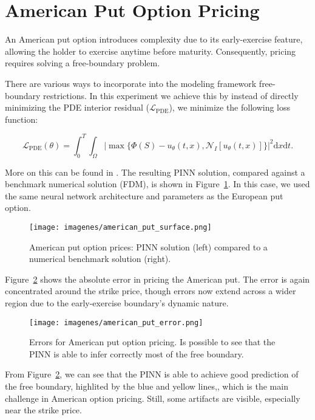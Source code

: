 \documentclass[12pt]{report} %
\theoremstyle{plain} %
\theoremstyle{definition} %
\theoremstyle{remark} %
\begin{document}
\section{American Put Option Pricing}

An American put option introduces complexity due to its early-exercise feature, 
allowing the holder to exercise anytime before maturity. Consequently, pricing requires 
solving a free-boundary problem. 

There are various ways to incorporate into the modeling framework free-boundary restrictions. In this experiment
we achieve this by instead of directly minimizing the PDE interior residual (\(\mathcal{L}_{\text{PDE}}\)), we minimize the
following loss function:

\begin{equation}
\label{eq:american_put_loss}
\mathcal{L}_{\text{PDE}}(\theta) = \int_{0}^{T}\int_{\Omega}\left|\max\{\Phi(S)- u_\theta(t,x), \mathcal{N}_I[u_\theta(t,x)]\}\right|^2\mathrm{d}x\mathrm{d}t.
\end{equation}

More on this can be found in \cite{wilmott1995mathematics, IKONEN2004809}. The resulting PINN solution, compared against a benchmark 
numerical solution (FDM), is shown in Figure~\ref{fig:american_put_option}. In this case, we used
the same neural network architecture and parameters as the European put option.

\begin{figure}[H]
	\centering
	\texttt{[image: imagenes/american\_put\_surface.png]}
	\caption{American put option prices: PINN solution (left) compared to a numerical 
	benchmark solution (right).}
	\label{fig:american_put_option}
\end{figure}

Figure~\ref{fig:american_put_option_error} shows the absolute error in pricing the 
American put. The error is again concentrated around the strike price, though errors 
now extend across a wider region due to the early-exercise boundary's dynamic nature.

\begin{figure}[H]
	\centering
	\texttt{[image: imagenes/american\_put\_error.png]}
	\caption{Errors for American put option pricing. Is possible to see that the PINN is able to infer correctly most of the free boundary.}
	\label{fig:american_put_option_error}
\end{figure}

From Figure~\ref{fig:american_put_option_error}, we can see that the PINN is able to achieve good prediction of the free boundary, highlited by the blue and yellow lines,,
which is the main challenge in American option pricing. Still, some artifacts are visible, especially near the strike price.
\end{document}

